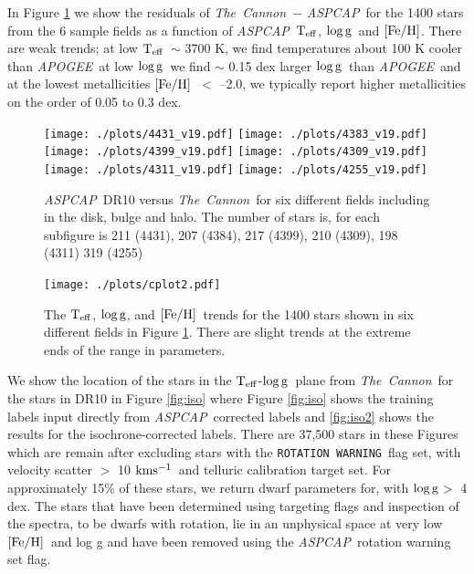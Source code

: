 \documentclass[12pt, preprint]{aastex}
\newcommand{\teff}{\mbox{$\rm T_{eff}$}}
\newcommand{\kms}{\mbox{$\rm kms^{-1}$}}
\newcommand{\feh}{\mbox{$\rm [Fe/H]$}}
\newcommand{\logg}{\mbox{$\rm \log g$}}
\newcommand{\tc}{\textsl{The~Cannon}}
\newcommand{\apogee}{\textsl{APOGEE}}
\newcommand{\aspcap}{\textsl{ASPCAP}}
\newcommand{\rotwarn}{\texttt{ROTATION WARNING}}
\begin{document}
In Figure \ref{fig:cal} we show the residuals of \tc\ $-$ \aspcap\ for the 1400 stars from the 6 sample fields as a function of \aspcap\ \teff, \logg\ and \feh. There are weak trends; at low \teff\ $\sim$ 3700 K, we find temperatures about 100 K cooler than \apogee\, at low \logg\ we find $\sim$ 0.15 dex larger \logg\ than \apogee\ and at the lowest metallicities \feh\ $<$ --2.0, we typically report higher metallicities on the order of 0.05 to 0.3 dex. 


\begin{figure}[!h]
\centering
  \texttt{[image: ./plots/4431\_v19.pdf]}
    \texttt{[image: ./plots/4383\_v19.pdf]} \\
      \texttt{[image: ./plots/4399\_v19.pdf]}
        \texttt{[image: ./plots/4309\_v19.pdf]} \\
              \texttt{[image: ./plots/4311\_v19.pdf]}
        \texttt{[image: ./plots/4255\_v19.pdf]} 
\caption{\small{\aspcap\ DR10 versus \tc\ for six different fields including in the disk, bulge and halo. The number of stars is, for each subfigure is 211 (4431), 207 (4384), 217 (4399), 210 (4309), 198 (4311) 319 (4255) }}
\label{fig:cal}
\end{figure}

\begin{figure}[!h]
\centering
        \texttt{[image: ./plots/cplot2.pdf]} 
\caption{The \teff, \logg, and \feh\ trends for the 1400 stars shown in six different fields in Figure \ref{fig:cal}. There are slight trends at the extreme ends of the range in parameters.}
\label{fig:cplot}
\end{figure}


We show the location of the stars in the \teff-\logg\ plane from \tc\ for the stars in DR10 in Figure \ref{fig:iso} where Figure \ref{fig:iso} shows the training labels input directly from \aspcap\ corrected labels and \ref{fig:iso2} shows the results for the isochrone-corrected labels. There are 37,500 stars in these Figures which are remain after excluding stars with the \rotwarn\ flag set, with velocity scatter $>$ 10 \kms\ and telluric calibration target set. For approximately 15\% of these stars, we return dwarf parameters for, with \logg $>$ 4 dex.  The stars that have been determined using targeting flags and inspection of the spectra, to be dwarfs with rotation, lie in an unphysical space at very low \feh\ and log g and have been removed using the \aspcap\ rotation warning set flag. 
\end{document}
